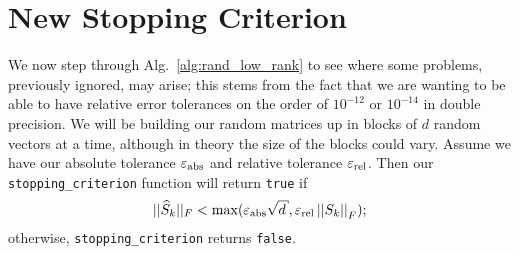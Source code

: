 \section{New Stopping Criterion}
\label{sec:rand_new_stopping}

We now step through Alg.~\ref{alg:rand_low_rank} to see
where some problems, previously ignored, may arise;
this stems from the fact that we are wanting to be able to have
relative error tolerances on the order of $10^{-12}$ or $10^{-14}$
in double precision.
We will be building our random matrices up in blocks of $d$ random
vectors at a time, although in theory the size of the blocks could vary.
Assume we have our absolute tolerance $\varepsilon_{\text{abs}}$ and relative tolerance $\varepsilon_{\text{rel}}$.
Then our \texttt{stopping\_criterion} function will return \texttt{true} if
%
\begin{equation}
    ||\widehat{S}_{k}||_{F} < \max(\epsa\sqrt{d},\epsr\norm{S_{k}}_{F});
\end{equation}
%
otherwise, \texttt{stopping\_criterion} returns \texttt{false}.

